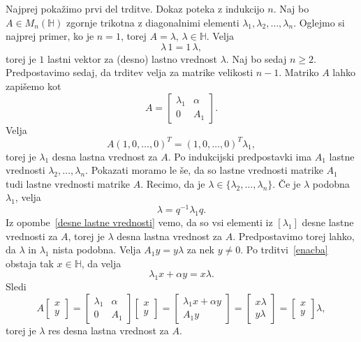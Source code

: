 \documentclass[mat1, tisk]{fmfdelo}
\numberwithin{equation}{section}
\begin{document}
\begin{dokaz}
    Najprej pokažimo prvi del trditve. Dokaz poteka z indukcijo $n$. Naj bo $A \in M_{n}(\mathbb{H})$ 
    zgornje trikotna z diagonalnimi elementi $\lambda_1, \lambda_2, \ldots, \lambda_n$. Oglejmo si najprej primer, ko je
    $n = 1$, torej $A = \lambda, \, \lambda \in \mathbb{H}$. Velja
    $$\lambda \, 1 = 1 \, \lambda,$$
    torej je $1$ lastni vektor za (desno) lastno vrednost $\lambda$. Naj bo sedaj $n \geq 2$.
    Predpostavimo sedaj, da trditev velja za matrike velikosti $n-1$. Matriko $A$ lahko zapišemo kot
    $$A =
    \begin{bmatrix}
        \lambda_1 & \alpha \\
        0 & A_{1}
    \end{bmatrix}.
    $$
    Velja
    $$A(1,0,\ldots, 0)^{T} = (1,0,\ldots, 0)^{T}\lambda_1,$$
    torej je $\lambda_1$ desna lastna vrednost za $A$. Po indukcijski predpostavki ima $A_{1}$ lastne vrednosti $\lambda_2, 
    \ldots, \lambda_n$.  Pokazati moramo le še, da so lastne vrednosti matrike $A_1$ tudi lastne vrednosti matrike $A$.
    Recimo, da je $\lambda \in \{\lambda_2, \ldots, \lambda_n\}$. Če je $\lambda$ podobna $\lambda_1$, velja
    $$\lambda = {q}^{-1}\lambda_1 q.$$
    Iz opombe~\ref{desne lastne vrednosti} vemo, da so vsi elementi iz $[\lambda_1]$ desne lastne vrednosti za $A$,
    torej je $\lambda$ desna lastna vrednost za $A$. 
    Predpostavimo torej lahko, da $\lambda$ in $\lambda_1$ nista 
    podobna. Velja $A_1 y = y \lambda$ za nek $y \neq 0$. Po trditvi~\ref{enacba} obstaja tak $x \in \mathbb{H}$, da velja
    $$\lambda_1 x + \alpha y = x\lambda.$$
    Sledi
    \begin{equation*}
        A
        \begin{bmatrix}
            x \\
            y
        \end{bmatrix}
        =
        \begin{bmatrix}
            \lambda_1 & \alpha \\
            0 & A_1
        \end{bmatrix}
        \begin{bmatrix}
            x \\
            y
        \end{bmatrix}
        =
        \begin{bmatrix}
            \lambda_1 x + \alpha y \\
            A_1 y
        \end{bmatrix}
        = 
        \begin{bmatrix}
            x \lambda \\
            y \lambda
        \end{bmatrix}
        =
        \begin{bmatrix}
            x \\
            y
        \end{bmatrix}
        \lambda,
    \end{equation*}
    torej je $\lambda$ res desna lastna vrednost za $A$. 


\end{dokaz}
\end{document}
